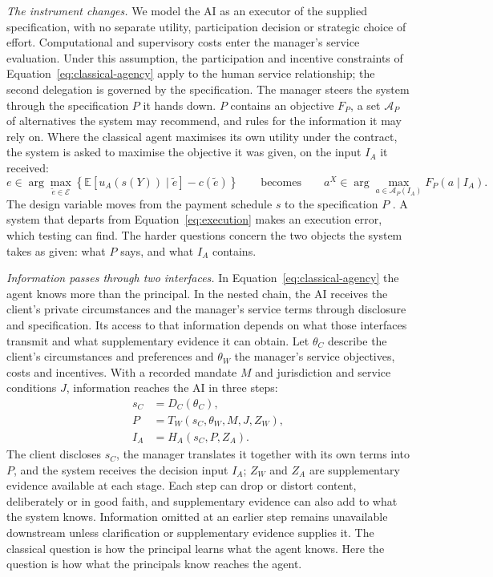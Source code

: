 \documentclass[oneside,10pt,english]{swissi}
\begin{document}
\emph{The instrument changes.} We model the AI as an executor of the supplied specification, with no separate utility, participation decision or strategic choice of effort. Computational and supervisory costs enter the manager's service evaluation. Under this assumption, the participation and incentive constraints of Equation~\eqref{eq:classical-agency} apply to the human service relationship; the second delegation is governed by the specification. The manager steers the system through the specification $P$ it hands down. $P$ contains an objective $F_P$, a set $\mathcal A_P$ of alternatives the system may recommend, and rules for the information it may rely on. Where the classical agent maximises its own utility under the contract, the system is asked to maximise the objective it was given, on the input $I_A$ it received:
\begin{equation}
 e\in\arg\max_{\tilde e\in\mathcal E}
 \left\{\mathbb E\!\left[u_A(s(Y))\mid\tilde e\right]-c(\tilde e)\right\}
 \qquad\text{becomes}\qquad
 a^X\in\arg\max_{a\in\mathcal A_P(I_A)}F_P(a\mid I_A).
 \label{eq:execution}
\end{equation}
The design variable moves from the payment schedule $s$ to the specification $P$ \parencite{zhuang2020misaligned}. A system that departs from Equation~\eqref{eq:execution} makes an execution error, which testing can find. The harder questions concern the two objects the system takes as given: what $P$ says, and what $I_A$ contains.

\emph{Information passes through two interfaces.} In Equation~\eqref{eq:classical-agency} the agent knows more than the principal. In the nested chain, the AI receives the client's private circumstances and the manager's service terms through disclosure and specification. Its access to that information depends on what those interfaces transmit and what supplementary evidence it can obtain. Let $\theta_C$ describe the client's circumstances and preferences and $\theta_W$ the manager's service objectives, costs and incentives. With a recorded mandate $M$ and jurisdiction and service conditions $J$, information reaches the AI in three steps:
\begin{equation}
 \begin{aligned}
 s_C &= D_C(\theta_C),\\
 P &= T_W(s_C,\theta_W,M,J,Z_W),\\
 I_A &= H_A(s_C,P,Z_A).
 \end{aligned}
 \label{eq:information-cascade}
\end{equation}
The client discloses $s_C$, the manager translates it together with its own terms into $P$, and the system receives the decision input $I_A$; $Z_W$ and $Z_A$ are supplementary evidence available at each stage. Each step can drop or distort content, deliberately \parencite{crawford1982strategic} or in good faith, and supplementary evidence can also add to what the system knows. Information omitted at an earlier step remains unavailable downstream unless clarification or supplementary evidence supplies it. The classical question is how the principal learns what the agent knows. Here the question is how what the principals know reaches the agent.
\end{document}
